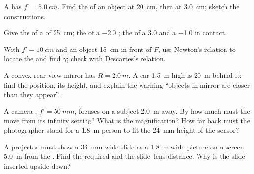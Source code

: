 \begin{exercise}[$\star$]\label{exo:b1:mirrors-thin-lenses:2}
A  has $f' = \qty{5.0}{cm}$. Find the  of an object
at \qty{20}{cm}, then at \qty{3.0}{cm}; sketch the constructions.
\end{exercise}

\begin{exercise}[$\star$]\label{exo:b1:mirrors-thin-lenses:3}
Give the  of a  of  \qty{25}{cm}; the  of a \qty{-2.0}{\delta} ; the  of a
\qty{+3.0}{\delta} and a \qty{-1.0}{\delta}  in contact.
\end{exercise}

\begin{exercise}[$\star$]\label{exo:b1:mirrors-thin-lenses:4}
With $f' = \qty{10}{cm}$ and an object \qty{15}{cm} in front of $F$,
use Newton's relation to locate the  and find $\gamma$; check with
Descartes's relation.
\end{exercise}

\begin{exercise}[$\star\star$]\label{exo:b1:mirrors-thin-lenses:5}
A convex rear-view mirror has $R = \qty{2.0}{m}$. A car \qty{1.5}{m}
high is \qty{20}{m} behind it: find the  position, its height, and
explain the warning ``objects in mirror are closer than they appear''.
\end{exercise}

\begin{exercise}[$\star\star$]\label{exo:b1:mirrors-thin-lenses:6}
A camera , $f' = \qty{50}{mm}$, focuses on a subject \qty{2.0}{m}
away. By how much must the  move from its infinity setting? What
is the magnification? How far back must the photographer stand for a
\qty{1.8}{m} person to fit the \qty{24}{mm} height of the sensor?
\end{exercise}

\begin{exercise}[$\star\star$]\label{exo:b1:mirrors-thin-lenses:7}
A projector must show a \qty{36}{mm} wide slide as a \qty{1.8}{m} wide
picture on a screen \qty{5.0}{m} from the . Find the required  and the slide--lens distance. Why is the slide inserted upside
down?
\end{exercise}

